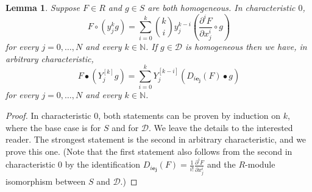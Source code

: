 \documentclass[12pt, reqno]{amsart}
\numberwithin{equation}{section}
\newcommand{\N}{{\mathbb N}}
\newcommand{\contract}{\bullet}
\theoremstyle{plain} %
\newtheorem{lem}[thm]{Lemma}
\theoremstyle{definition}
\theoremstyle{remark}
\begin{document}
\begin{lem}\label{lem:prodrulekp}
Suppose $F\in R$ and $g\in S$ are both homogeneous.  In characteristic $0$,
\[
F\circ (y_j^k g)=\displaystyle \sum_{i=0}^k \binom{k}{i} y_j^{k-i}\left( \frac{\partial^i F}{\partial x_j^i}\circ g\right)
\]
for every $j=0,\ldots,N$ and every $k \in \N$.  If $g\in\mathcal{D}$ is homogeneous then we have, in arbitrary characteristic,
\[
F\contract (Y_j^{[k]}g) = \displaystyle \sum_{i=0}^k Y_j^{[k-i]}(D_{i\mathbf{e_j}}(F)\contract g)
\]
for every $j=0,\ldots,N$ and every $k \in \N$.
\end{lem}
\begin{proof}
In characteristic $0$, both statements can be proven by induction on $k$, where the base case is  for $S$ and  for $\mathcal{D}$.  We leave the details to the interested reader.  The strongest statement is the second in arbitrary characteristic, and we prove this one.  (Note that the first statement also follows from the second in characteristic $0$ by the identification $D_{i\mathbf{e_j}}(F)=\frac{1}{i!}\frac{\partial^i F}{\partial x_j^i}$ and the $R$-module isomorphism between $S$ and $\mathcal{D}$.)


\end{proof}
\end{document}
